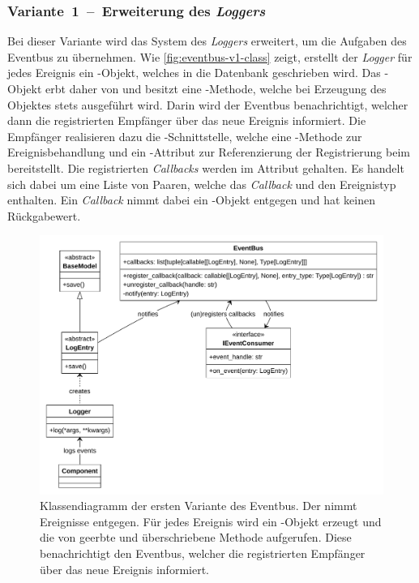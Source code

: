 \subsubsection*{Variante~1~--~Erweiterung des \emph{Loggers}}

Bei dieser Variante wird das System des \emph{Loggers} erweitert, um die Aufgaben des Eventbus zu übernehmen. Wie \autoref{fig:eventbus-v1-class} zeigt, erstellt der \emph{Logger} für jedes Ereignis ein -Objekt, welches in die Datenbank geschrieben wird. Das -Objekt erbt daher von  und besitzt eine -Methode, welche bei Erzeugung des Objektes stets ausgeführt wird. Darin wird der Eventbus benachrichtigt, welcher dann die registrierten Empfänger über das neue Ereignis informiert. Die Empfänger realisieren dazu die -Schnittstelle, welche eine -Methode zur Ereignisbehandlung und ein -Attribut zur Referenzierung der Registrierung beim  bereitstellt. Die registrierten \emph{Callbacks} werden im Attribut  gehalten. Es handelt sich dabei um eine Liste von Paaren, welche das \emph{Callback} und den Ereignistyp enthalten. Ein \emph{Callback} nimmt dabei ein -Objekt entgegen und hat keinen Rückgabewert.

\begin{figure}[!ht]
	\centering
	\includegraphics[width=1.0\linewidth]{images/diagrams/eventbus-v1-class.pdf}
	\caption{Klassendiagramm der ersten Variante des Eventbus. Der  nimmt Ereignisse entgegen. Für jedes Ereignis wird ein -Objekt erzeugt und die von  geerbte und überschriebene Methode  aufgerufen. Diese benachrichtigt den Eventbus, welcher die registrierten Empfänger über das neue Ereignis informiert.}
	\label{fig:eventbus-v1-class}
\end{figure}

